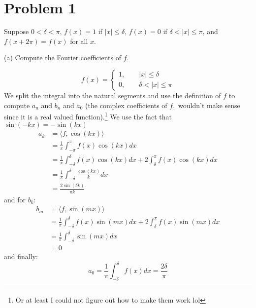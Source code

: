 \documentclass[11pt]{article}
\begin{document}
	
	
	\psetheader

\section*{Problem 1}
\begin{problem}
Suppose \(0 < \delta < \pi\), \( f(x) = 1 \) if \( |x| \leq \delta \), \( f(x) = 0 \) if \( \delta < |x| \leq \pi \), and \( f(x + 2\pi) = f(x) \) for all \( x \).
\end{problem}
\begin{itemize}
\begin{problem}
        \item[(a)] Compute the Fourier coefficients of \( f \).
  \end{problem}
\begin{solution}
\[f(x) = \begin{cases}
    1, \qquad |x|\leq \delta\\
    0, \qquad \delta < |x|\leq \pi
\end{cases}\]
    We split the integral into the natural segments and use the definition of $f$ to compute $a_n$ and $b_n$ and $a_0$  (the complex coefficients of $f,$ wouldn't make sense since it is a real valued function).\footnote{Or at least I could not figure out how to make them work lol} We use the fact that $\sin(-kx) = -\sin(kx)$
    \begin{align*}
        a_k &= \langle f, \cos(kx)\rangle\\
        &= \frac{1}{\pi}\int_{-\pi}^\pi f(x)\cos(kx)dx\\
        &= \frac{1}{\pi}\int_{-\delta}^\delta f(x) \cos(kx)dx + 2\int_{\delta}^{\pi}f(x)\cos(kx)dx\\
        &= \frac{1}{\pi}\int_{-\delta}^\delta \frac{\cos(kx)}{k}dx\\
        &= \frac{2\sin(\delta k)}{\pi k}
    \end{align*}
    and for $b_k:$
    \begin{align*}
        b_m &= \langle f, \sin(mx)\rangle\\
        &= \frac{1}{\pi}\int_{-\delta}^\delta f(x) \sin(mx)dx + 2\int_{\delta}^{\pi}f(x)\sin(mx)dx\\
        &= \frac{1}{\pi}\int_{-\delta}^\delta \sin(mx)dx\\
        &= 0
    \end{align*}
    and finally:
    \[a_0 = \frac{1}{\pi}\int_{-\delta}^\delta f(x)dx = \frac{2\delta}{\pi}\]

\end{solution}
\end{itemize}
\end{document}
